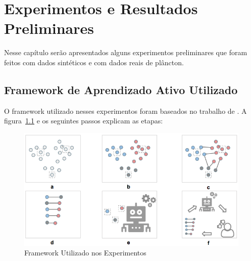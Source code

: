 \chapter{Experimentos e Resultados Preliminares}
\label{cap:Experimentos_Resultados}


Nesse capítulo serão apresentados alguns experimentos preliminares que foram feitos com dados sintéticos e com dados reais de plâncton. 

\section{Framework de Aprendizado Ativo Utilizado}
\label{sec:framework_al}

O framework utilizado nesses experimentos foram baseados no trabalho de \citep{saito2014active}. A figura~\ref{fig:priscila_algoritmo} e os seguintes passos explicam as etapas:

\begin{figure}
  \centering
  \includegraphics[width=1.0\textwidth]{figures/priscila_algoritmo.png}
  \caption{Framework Utilizado nos Experimentos}
  \label{fig:priscila_algoritmo}
\end{figure}





